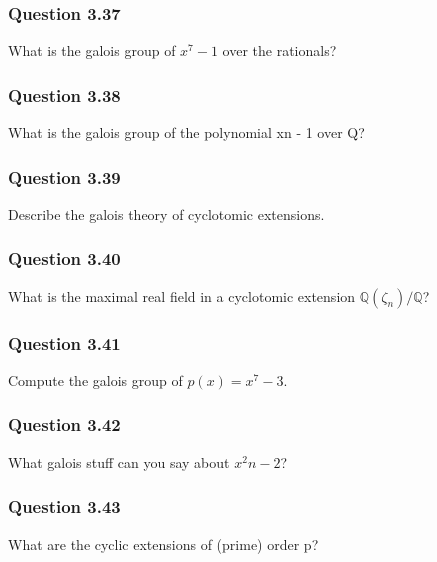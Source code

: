 \hypertarget{question-3.37}{%
\subsubsection{Question 3.37}\label{question-3.37}}

What is the galois group of \(x^7 - 1\) over the rationals?

\hypertarget{question-3.38}{%
\subsubsection{Question 3.38}\label{question-3.38}}

What is the galois group of the polynomial xn - 1 over Q?

\hypertarget{question-3.39}{%
\subsubsection{Question 3.39}\label{question-3.39}}

Describe the galois theory of cyclotomic extensions.

\hypertarget{question-3.40}{%
\subsubsection{Question 3.40}\label{question-3.40}}

What is the maximal real field in a cyclotomic extension
\({\mathbb{Q}}(\zeta_n)/{\mathbb{Q}}\)?

\hypertarget{question-3.41}{%
\subsubsection{Question 3.41}\label{question-3.41}}

Compute the galois group of \(p(x) = x^7 - 3\).

\hypertarget{question-3.42}{%
\subsubsection{Question 3.42}\label{question-3.42}}

What galois stuff can you say about \(x^2n - 2\)?

\hypertarget{question-3.43}{%
\subsubsection{Question 3.43}\label{question-3.43}}

What are the cyclic extensions of (prime) order p?

